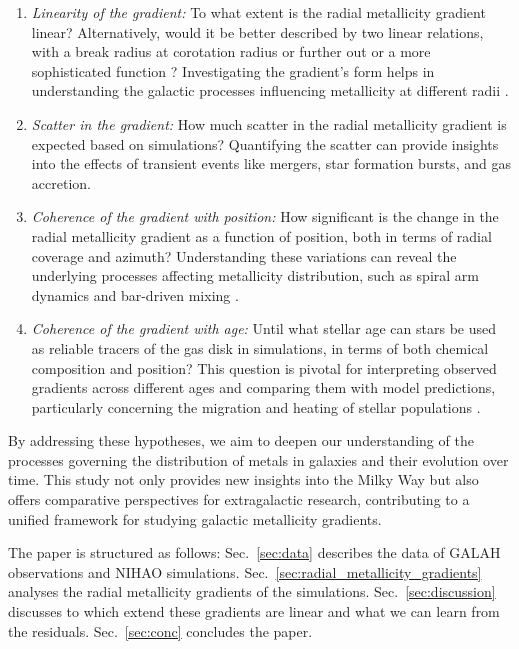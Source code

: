 \documentclass[fleqn,usenatbib]{mnras}
\begin{document}
\begin{enumerate}
    \item \textit{Linearity of the gradient:} To what extent is the radial metallicity gradient linear? Alternatively, would it be better described by two linear relations, with a break radius at corotation radius \citep[][and references therein]{Bresolin2012} or further out \citep{Donor2020} or a more sophisticated function \citep[see e.g.][]{Chiappini2001, Kubryk2015}? Investigating the gradient's form helps in understanding the galactic processes influencing metallicity at different radii \citep{Minchev2014b}.
    \item \textit{Scatter in the gradient:} How much scatter in the radial metallicity gradient is expected based on simulations? Quantifying the scatter can provide insights into the effects of transient events like mergers, star formation bursts, and gas accretion.
    \item \textit{Coherence of the gradient with position:} How significant is the change in the radial metallicity gradient as a function of position, both in terms of radial coverage and azimuth? Understanding these variations can reveal the underlying processes affecting metallicity distribution, such as spiral arm dynamics and bar-driven mixing \citep[see their Figs. 5-8][]{DiMatteo2013}.
    \item \textit{Coherence of the gradient with age:} Until what stellar age can stars be used as reliable tracers of the gas disk in simulations, in terms of both chemical composition and position? This question is pivotal for interpreting observed gradients across different ages \citep[e.g.][]{Willett2023} and comparing them with model predictions, particularly concerning the migration and heating of stellar populations \citep{Binney2008, Frankel2018}.
\end{enumerate}

By addressing these hypotheses, we aim to deepen our understanding of the processes governing the distribution of metals in galaxies and their evolution over time. This study not only provides new insights into the Milky Way but also offers comparative perspectives for extragalactic research, contributing to a unified framework for studying galactic metallicity gradients.

The paper is structured as follows: Sec.~\ref{sec:data} describes the data of GALAH observations and NIHAO simulations. Sec.~\ref{sec:radial_metallicity_gradients} analyses the radial metallicity gradients of the simulations. Sec.~\ref{sec:discussion} discusses to which extend these gradients are linear and what we can learn from the residuals. Sec.~\ref{sec:conc} concludes the paper.
\end{document}
